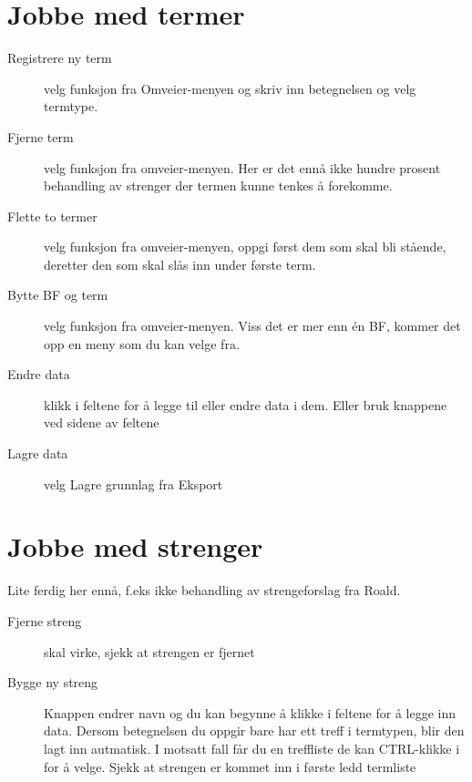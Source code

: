 \documentclass[a4paper,norsk,11pt]{article}
\begin{document}
\section{Jobbe med termer}
\begin{description}
\item[Registrere ny term] velg funksjon fra Omveier-menyen og skriv inn betegnelsen og velg termtype.
\item[Fjerne term] velg funksjon fra omveier-menyen. Her er det ennå ikke hundre prosent behandling av strenger der termen kunne tenkes å forekomme.
\item[Flette to termer] velg funksjon fra omveier-menyen, oppgi først dem som skal bli stående, deretter den som skal slås inn under første term.
\item[Bytte BF og term] velg funksjon fra omveier-menyen. Viss det er mer enn én BF, kommer det opp en meny som du kan velge fra.
\item[Endre data] klikk i feltene for å legge til eller endre data i dem. Eller bruk knappene ved sidene av feltene
\item[Lagre data] velg Lagre grunnlag fra Eksport
\end{description}

\section{Jobbe med strenger}
Lite ferdig her ennå, f.eks ikke behandling av strengeforslag fra Roald.
\begin{description}
 \item[Fjerne streng] skal virke, sjekk at strengen er fjernet
\item[Bygge ny streng] Knappen endrer navn og du kan begynne å klikke i feltene for å legge inn data. Dersom betegnelsen du oppgir bare har ett treff i termtypen, blir den lagt inn autmatisk. I motsatt fall får du en treffliste de kan CTRL-klikke i for å velge. Sjekk at strengen er kommet inn i første ledd termliste
\end{description}
\end{document}

